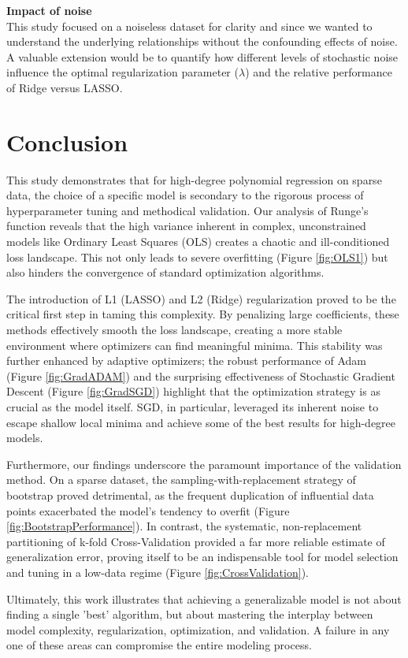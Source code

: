 \documentclass[twocolumn,aps]{revtex4}
\begin{document}
\textbf{Impact of noise}
\\
This study focused on a noiseless dataset for clarity and since we wanted to understand the underlying relationships without the confounding effects of noise.
A valuable extension would be to quantify how different levels of stochastic noise influence the optimal regularization parameter ($\lambda$) and the relative performance of Ridge versus LASSO. 
\\

\section{Conclusion}\label{section:conclusion} 

This study demonstrates that for high-degree polynomial regression on sparse data, the choice of a specific model is secondary to the rigorous process of hyperparameter tuning and methodical validation. Our analysis of Runge's function reveals that the high variance inherent in complex, unconstrained models like Ordinary Least Squares (OLS) creates a chaotic and ill-conditioned loss landscape. This not only leads to severe overfitting (Figure \ref{fig:OLS1}) but also hinders the convergence of standard optimization algorithms.

The introduction of L1 (LASSO) and L2 (Ridge) regularization proved to be the critical first step in taming this complexity. By penalizing large coefficients, these methods effectively smooth the loss landscape, creating a more stable environment where optimizers can find meaningful minima. This stability was further enhanced by adaptive optimizers; the robust performance of Adam (Figure \ref{fig:GradADAM}) and the surprising effectiveness of Stochastic Gradient Descent (Figure \ref{fig:GradSGD}) highlight that the optimization strategy is as crucial as the model itself. SGD, in particular, leveraged its inherent noise to escape shallow local minima and achieve some of the best results for high-degree models.

Furthermore, our findings underscore the paramount importance of the validation method. On a sparse dataset, the sampling-with-replacement strategy of bootstrap proved detrimental, as the frequent duplication of influential data points exacerbated the model's tendency to overfit (Figure \ref{fig:BootstrapPerformance}). In contrast, the systematic, non-replacement partitioning of k-fold Cross-Validation provided a far more reliable estimate of generalization error, proving itself to be an indispensable tool for model selection and tuning in a low-data regime (Figure \ref{fig:CrossValidation}).

Ultimately, this work illustrates that achieving a generalizable model is not about finding a single 'best' algorithm, but about mastering the interplay between model complexity, regularization, optimization, and validation. A failure in any one of these areas can compromise the entire modeling process.



\end{document}

